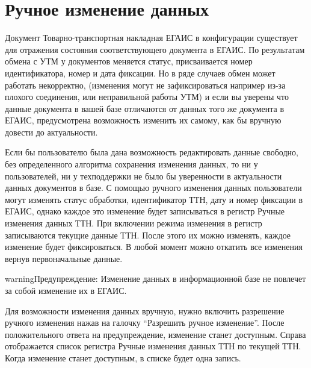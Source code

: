 \documentclass[letterpaper,10pt,russian]{sphinxmanual}
\begin{document}
\section{Ручное изменение данных}
\label{ttn:id5}
Документ Товарно-транспортная накладная ЕГАИС в конфигурации существует для отражения состояния соответствующего документа в ЕГАИС. По результатам обмена с УТМ у документов меняется статус, присваивается номер идентификатора, номер и дата фиксации. Но в ряде случаев обмен может работать некорректно, (изменения могут не зафиксироваться например из-за плохого соединения, или неправильной работы УТМ) и если вы уверены что данные документа в вашей базе отличаются от данных того же документа в ЕГАИС, предусмотрена возможность изменить их самому, как бы вручную довести до актуальности.
\begin{figure}[htbp]
\centering

\noindent{}
\end{figure}

Если бы пользователю была дана возможность редактировать данные свободно, без определенного алгоритма сохранения изменения данных, то ни у пользователей, ни у техподдержки не было бы уверенности в актуальности данных документов в базе.
С помощью ручного изменения данных пользователи могут изменять статус обработки, идентификатор ТТН, дату и номер фиксации в ЕГАИС, однако каждое это изменение будет записываться в регистр Ручные изменения данных ТТН. При включении режима изменения в регистр записываются текущие данные ТТН. После этого их можно изменять, каждое изменение будет фиксироваться. В любой момент можно откатить все изменения вернув первоначальные данные.

\begin{notice}{warning}{Предупреждение:}
Изменение данных в информационной базе не повлечет за собой изменение их в ЕГАИС.
\end{notice}
\begin{figure}[htbp]
\centering

\noindent{}
\end{figure}

Для возможности изменения данных вручную, нужно включить разрешение ручного изменения нажав на галочку ``Разрешить ручное изменение''. После положительного ответа на предупреждение, изменение станет доступным. Справа отображается список регистра Ручные изменения данных ТТН по текущей ТТН. Когда изменение станет доступным, в списке будет одна запись.
\begin{figure}[htbp]
\centering

\noindent{}
\end{figure}
\end{document}

